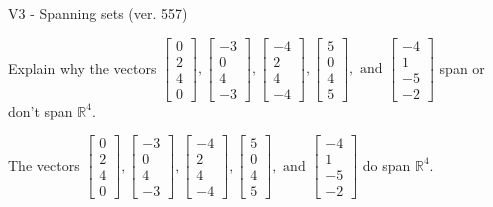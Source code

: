 \begin{exercise}
  \begin{exerciseTitle}V3 - Spanning sets (ver. 557)\end{exerciseTitle}
  \begin{exerciseStatement}
    Explain why the vectors \(\left[\begin{array}{r}
0 \\
2 \\
4 \\
0
\end{array}\right] , \left[\begin{array}{r}
-3 \\
0 \\
4 \\
-3
\end{array}\right] , \left[\begin{array}{r}
-4 \\
2 \\
4 \\
-4
\end{array}\right] , \left[\begin{array}{r}
5 \\
0 \\
4 \\
5
\end{array}\right] , \text{ and } \left[\begin{array}{r}
-4 \\
1 \\
-5 \\
-2
\end{array}\right]\) span or don't span \(\mathbb{R}^4\). 
	


  \end{exerciseStatement}
  \begin{exerciseAnswer}
   The vectors \(\left[\begin{array}{r}
0 \\
2 \\
4 \\
0
\end{array}\right] , \left[\begin{array}{r}
-3 \\
0 \\
4 \\
-3
\end{array}\right] , \left[\begin{array}{r}
-4 \\
2 \\
4 \\
-4
\end{array}\right] , \left[\begin{array}{r}
5 \\
0 \\
4 \\
5
\end{array}\right] , \text{ and } \left[\begin{array}{r}
-4 \\
1 \\
-5 \\
-2
\end{array}\right]\) 
  	 do  
	span \(\mathbb{R}^4\).
  


  \end{exerciseAnswer}
\end{exercise}